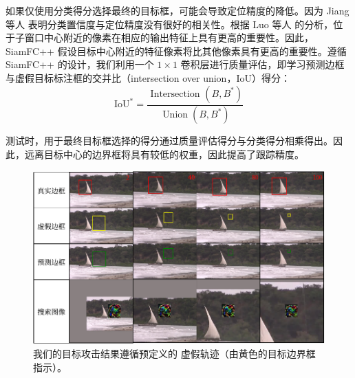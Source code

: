 如果仅使用分类得分选择最终的目标框，可能会导致定位精度的降低。因为 Jiang 等人 \cite{IoU-Net} 表明分类置信度与定位精度没有很好的相关性。根据 Luo 等人 \cite{ERF} 的分析，位于子窗口中心附近的像素在相应的输出特征上具有更高的重要性。因此，SiamFC++ 假设目标中心附近的特征像素将比其他像素具有更高的重要性。遵循 SiamFC++ 的设计，我们利用一个 $1 \times 1$ 卷积层进行质量评估，即学习预测边框与虚假目标标注框的交并比（intersection over union，IoU）得分：
\begin{equation}
\mathrm{IoU}^{*}=\frac{\text { Intersection }\left(B, B^{*}\right)}{\operatorname{Union}\left(B, B^{*}\right)}
\end{equation}

测试时，用于最终目标框选择的得分通过质量评估得分与分类得分相乘得出。因此，远离目标中心的边界框将具有较低的权重，因此提高了跟踪精度。

\begin{figure}[t]
\centering
\includegraphics[width=1.0\textwidth]{Img/attack/vis_v4.pdf}
\caption{我们的目标攻击结果遵循预定义的 虚假轨迹（由黄色的目标边界框指示）。}
\label{fig:attack_vis}
\end{figure}

